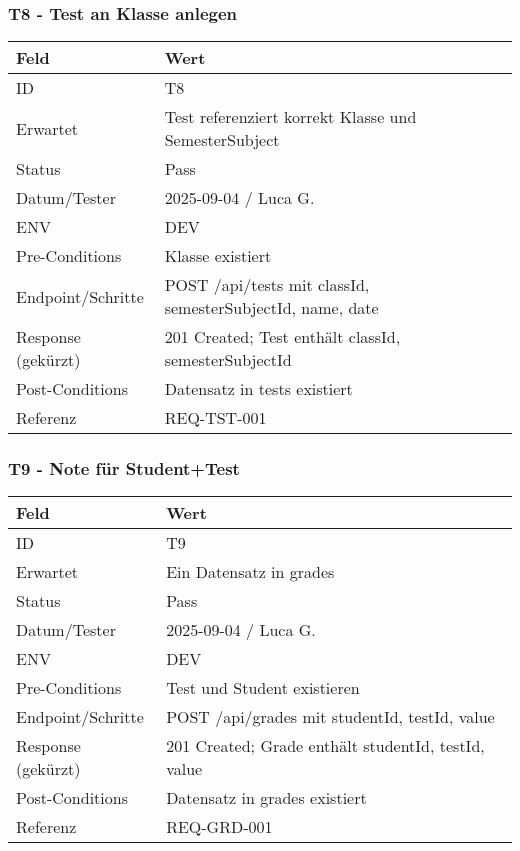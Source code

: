 \documentclass[12pt,a4paper]{article}
\begin{document}
    \subsubsection{T8 - Test an Klasse anlegen}
    {\small
        \begin{tabularx}{\textwidth}{|p{3.2cm}|X|}
            \hline
            \textbf{Feld} & \textbf{Wert} \\ \hline
            ID & T8 \\ \hline
            Erwartet & Test referenziert korrekt Klasse und SemesterSubject \\ \hline
            Status & Pass \\ \hline
            Datum/Tester & 2025-09-04 / Luca G. \\ \hline
            ENV & DEV \\ \hline
            Pre-Conditions & Klasse existiert \\ \hline
            Endpoint/Schritte & POST /api/tests mit {classId, semesterSubjectId, name, date} \\ \hline
            Response (gekürzt) & 201 Created; Test enth\"alt classId, semesterSubjectId \\ \hline
            Post-Conditions & Datensatz in tests existiert \\ \hline
            Referenz & REQ-TST-001 \\ \hline
        \end{tabularx}
    }

    \subsubsection{T9 - Note für Student+Test}
    {\small
        \begin{tabularx}{\textwidth}{|p{3.2cm}|X|}
            \hline
            \textbf{Feld} & \textbf{Wert} \\ \hline
            ID & T9 \\ \hline
            Erwartet & Ein Datensatz in grades \\ \hline
            Status & Pass \\ \hline
            Datum/Tester & 2025-09-04 / Luca G. \\ \hline
            ENV & DEV \\ \hline
            Pre-Conditions & Test und Student existieren \\ \hline
            Endpoint/Schritte & POST /api/grades mit {studentId, testId, value} \\ \hline
            Response (gekürzt) & 201 Created; Grade enth\"alt studentId, testId, value \\ \hline
            Post-Conditions & Datensatz in grades existiert \\ \hline
            Referenz & REQ-GRD-001 \\ \hline
        \end{tabularx}
    }
\end{document}

